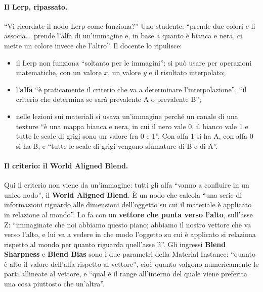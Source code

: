 \paragraph{Il Lerp, ripassato.} ``Vi ricordate il nodo Lerp come funziona?'' Uno studente:
``prende due colori e li associa\dots\ prende l'alfa di un'immagine e, in base a quanto è
bianca e nera, ci mette un colore invece che l'altro''. Il docente lo ripulisce:
\begin{itemize}
  \item il Lerp non funziona ``soltanto per le immagini'': si può usare per operazioni
        matematiche, con un valore $x$, un valore $y$ e il risultato interpolato;
  \item l'\textbf{alfa} ``è praticamente il criterio che va a determinare
        l'interpolazione'', ``il criterio che determina se sarà prevalente A o prevalente
        B'';
  \item nelle lezioni sui materiali si usava un'immagine perché un canale di una texture
        ``è una mappa bianca e nera, in cui il nero vale 0, il bianco vale 1 e tutte le
        scale di grigi sono un valore fra 0 e 1''. Con alfa 1 si ha A, con alfa 0 si ha B, e
        ``tutte le scale di grigi vengono sfumature di B e di A''.
\end{itemize}

\paragraph{Il criterio: il World Aligned Blend.} Qui il criterio non viene da un'immagine:
tutti gli alfa ``vanno a confluire in un unico nodo'', il \textbf{World Aligned Blend}. È un
nodo che calcola ``una serie di informazioni riguardo alle dimensioni dell'oggetto su cui il
materiale è applicato in relazione al mondo''. Lo fa con un \textbf{vettore che punta verso
l'alto}, sull'asse Z: ``immaginate che noi abbiamo questo piano; abbiamo il nostro vettore
che va verso l'alto, e lui va a vedere in che modo l'oggetto su cui è applicato si relaziona
rispetto al mondo per quanto riguarda quell'asse lì''. Gli ingressi \textbf{Blend
Sharpness} e \textbf{Blend Bias} sono i due parametri della Material Instance: ``quanto è
alto il valore dell'alfa rispetto al vettore'', cioè quanto valgono numericamente le parti
allineate al vettore, e ``qual è il range all'interno del quale viene preferita una cosa
piuttosto che un'altra''.

